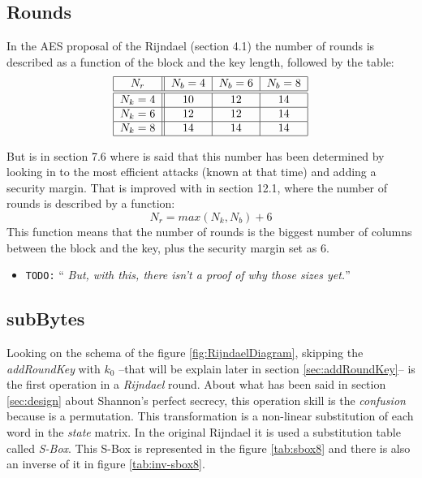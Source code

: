 \documentclass[10pt,a4paper,twoside]{llncs}
\newcommand{\todo}[1]{\texttt{\color{red}TODO:} ``\emph{#1}''}
\begin{document}
\subsection{Rounds}\label{sec:rounds}

In the AES proposal of the Rijndael \cite{Daemen01aes-ammended} (section 4.1) the number of rounds is described as a function of the block and the key length, followed by the table:
\begin{equation}\label{tab:nrounds}
\begin{tabular}{|c||c|c|c|}
\hline
$N_r$     & $N_b = 4$ & $N_b = 6$ & $N_b = 8$ \\ \hline\hline
$N_k = 4$ &    $10$   &    $12$   &    $14$   \\ \hline
$N_k = 6$ &    $12$   &    $12$   &    $14$   \\ \hline
$N_k = 8$ &    $14$   &    $14$   &    $14$   \\ \hline
\end{tabular}
\end{equation}

 But is in section 7.6 where is said that this number has been determined by looking in to the most efficient attacks (known at that time) and adding a security margin. That is improved with in section 12.1, where the number of rounds is described by a function:
\begin{equation}\label{eq:nrounds}
 N_r = max(N_k,N_b)+6
\end{equation}
This function means that the number of rounds is the biggest number of columns between the block and the key, plus the security margin set as $6$.

\begin{itemize}
 \item \todo{ But, with this, there isn't a proof of why those sizes yet.}
\end{itemize}



\subsection{subBytes}\label{sec:subBytes}

Looking on the schema of the figure \ref{fig:RijndaelDiagram}, skipping the \emph{addRoundKey} with $k_0$ --that will be explain later in section \ref{sec:addRoundKey}-- is the first operation in a \emph{Rijndael} round. About what has been said in section \ref{sec:design} about Shannon's perfect secrecy, this operation skill is the \emph{confusion} because is a permutation. This transformation is a non-linear substitution of each word in the \emph{state} matrix. In the original Rijndael it is used a substitution table called \emph{S-Box}. This S-Box is represented in the figure \ref{tab:sbox8} and there is also an inverse of it in figure \ref{tab:inv-sbox8}.
\end{document}
